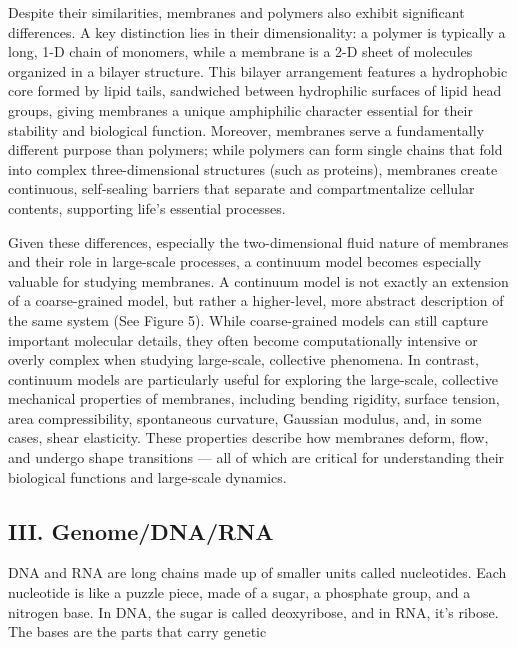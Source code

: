 \documentclass[12pt]{article}
\begin{document}
\begin{flushleft}
Despite their similarities, membranes and polymers also exhibit significant differences. A key distinction lies in their dimensionality: a polymer is typically a long, 1-D chain of monomers, while a membrane is a 2-D sheet of molecules organized in a bilayer structure. This bilayer arrangement features a hydrophobic core formed by lipid tails, sandwiched between hydrophilic surfaces of lipid head groups, giving membranes a unique amphiphilic character essential for their stability and biological function. Moreover, membranes serve a fundamentally different purpose than polymers; while polymers can form single chains that fold into complex three-dimensional structures (such as proteins), membranes create continuous, self-sealing barriers that separate and compartmentalize cellular contents, supporting life’s essential processes.


Given these differences, especially the two-dimensional fluid nature of membranes and their role in large-scale processes, a continuum model becomes especially valuable for studying membranes. A continuum model is not exactly an extension of a coarse-grained model, but rather a higher-level, more abstract description of the same system (See Figure 5). While coarse-grained models can still capture important molecular details, they often become computationally intensive or overly complex when studying large-scale, collective phenomena. In contrast, continuum models are particularly useful for exploring the large-scale, collective mechanical properties of membranes, including bending rigidity, surface tension, area compressibility, spontaneous curvature, Gaussian modulus, and, in some cases, shear elasticity. These properties describe how membranes deform, flow, and undergo shape transitions — all of which are critical for understanding their biological functions and large-scale dynamics.





\vspace{-1em} 
\subsection*{III. Genome/DNA/RNA}
DNA and RNA are long chains made up of smaller units called nucleotides. Each nucleotide is like a puzzle piece, made of a sugar, a phosphate group, and a nitrogen base. In DNA, the sugar is called deoxyribose, and in RNA, it’s ribose. The bases are the parts that carry genetic 

\begin{figure}[!ht]
  \centering
  

\end{figure}
\end{flushleft}
\end{document}
